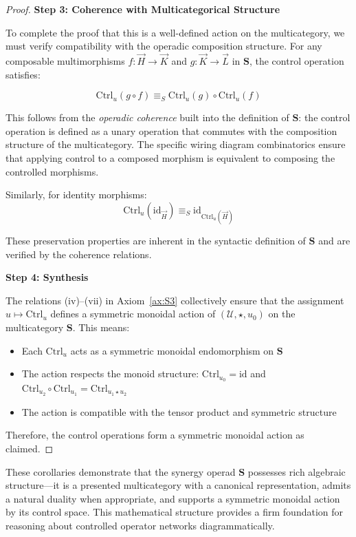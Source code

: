 \documentclass[11pt]{article}
\begin{document}
\begin{proof}
\noindent\textbf{Step 3: Coherence with Multicategorical Structure}

To complete the proof that this is a well-defined action on the multicategory, we must verify compatibility with the operadic composition structure. For any composable multimorphisms $f: \vec{H} \to \vec{K}$ and $g: \vec{K} \to \vec{L}$ in $\mathbf{S}$, the control operation satisfies:

\[
\mathrm{Ctrl}_u(g \circ f) \equiv_S \mathrm{Ctrl}_u(g) \circ \mathrm{Ctrl}_u(f)
\]

This follows from the \emph{operadic coherence} built into the definition of $\mathbf{S}$: the control operation is defined as a unary operation that commutes with the composition structure of the multicategory. The specific wiring diagram combinatorics ensure that applying control to a composed morphism is equivalent to composing the controlled morphisms.

Similarly, for identity morphisms:
\[
\mathrm{Ctrl}_u(\mathrm{id}_{\vec{H}}) \equiv_S \mathrm{id}_{\mathrm{Ctrl}_u(\vec{H})}
\]

These preservation properties are inherent in the syntactic definition of $\mathbf{S}$ and are verified by the coherence relations.

\noindent\textbf{Step 4: Synthesis}

The relations (iv)--(vii) in Axiom~\ref{ax:S3} collectively ensure that the assignment $u \mapsto \mathrm{Ctrl}_u$ defines a symmetric monoidal action of $(\mathcal{U}, \star, u_0)$ on the multicategory $\mathbf{S}$. This means:

\begin{itemize}
    \item Each $\mathrm{Ctrl}_u$ acts as a symmetric monoidal endomorphism on $\mathbf{S}$
    \item The action respects the monoid structure: $\mathrm{Ctrl}_{u_0} = \mathrm{id}$ and $\mathrm{Ctrl}_{u_2} \circ \mathrm{Ctrl}_{u_1} = \mathrm{Ctrl}_{u_1 \star u_2}$
    \item The action is compatible with the tensor product and symmetric structure
\end{itemize}

Therefore, the control operations form a symmetric monoidal action as claimed.
\end{proof}


These corollaries demonstrate that the synergy operad $\mathbf{S}$ possesses rich algebraic structure—it is a presented multicategory with a canonical representation, admits a natural duality when appropriate, and supports a symmetric monoidal action by its control space. This mathematical structure provides a firm foundation for reasoning about controlled operator networks diagrammatically.
\end{document}
